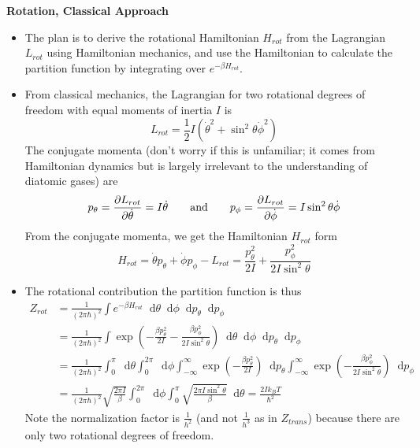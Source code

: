 \documentclass[11pt, a4paper]{article}
\newcommand{\diff}{\mathop{}\!\mathrm{d}} %
\begin{document}
\smallskip
\textbf{Rotation, Classical Approach}
\begin{itemize}
	\item The plan is to derive the rotational Hamiltonian $ H_{rot} $ from the Lagrangian $ L_{rot} $ using Hamiltonian mechanics, and use the Hamiltonian to calculate the partition function by integrating over $ e^{-\beta H_{rot}} $. 
	
	\item From classical mechanics, the Lagrangian for two rotational degrees of freedom with equal moments of inertia $ I $ is
	\begin{equation*}
		L_{rot} = \frac{1}{2} I\left(\dot{\theta}^{2} + \sin^{2}\theta \dot{\phi}^{2}\right)
	\end{equation*}
	The conjugate momenta (don't worry if this is unfamiliar; it comes from Hamiltonian dynamics but is largely irrelevant to the understanding of diatomic gases) are
	\begin{equation*}
		p_{\theta}  = \pdv{L_{rot}}{\dot{\theta}} = I \dot{\theta} \qquad \text{and} \qquad p_{\phi}  = \pdv{L_{rot}}{\dot{\phi}} = I \sin^{2}\theta \dot{\phi}
	\end{equation*}
	From the conjugate momenta, we get the Hamiltonian $ H_{rot} $ form
	\begin{equation*}
		H_{rot} = \dot{\theta}p_{\theta} + \dot{\phi}p_{\phi} - L_{rot} = \frac{p_{\theta}^{2}}{2I} + \frac{p_{\phi}^{2}}{2I\sin^{2}\theta}
	\end{equation*}
	
	\item The rotational contribution the partition function is thus
	\begin{align*}
		Z_{rot} &= \frac{1}{(2\pi \hbar)^{2}} \int e^{-\beta H_{rot}} \diff \theta \diff \phi \diff p_{\theta} \diff p_{\phi}\\
		& = \frac{1}{(2\pi \hbar)^{2}} \int \exp(-  \frac{\beta p_{\theta}^{2}}{2I} -  \frac{\beta p_{\phi}^{2}}{2I\sin^{2}\theta}) \diff \theta \diff \phi \diff p_{\theta} \diff p_{\phi}\\
		&= \frac{1}{(2\pi \hbar)^{2}}  \int_{0}^{\pi} \diff \theta  \int_{0}^{2\pi} \diff \phi \int_{-\infty}^{\infty} \exp(-  \frac{\beta p_{\theta}^{2}}{2I}) \diff p_{\theta} \int_{-\infty}^{\infty} \exp(-  \frac{\beta p_{\phi}^{2}}{2I\sin^{2}\theta}) \diff p_{\phi}\\
		&=\frac{1}{(2\pi \hbar)^{2}} \sqrt{\frac{2\pi I}{\beta}}  \int_{0}^{2\pi} \diff \phi  \int_{0}^{\pi} \sqrt{\frac{2\pi I \sin^{2}\theta}{\beta}} \diff \theta = \frac{2Ik_{B}T}{\hbar^{2}}
	\end{align*}
	Note the normalization factor is $\frac{1}{h^{2}}$ (and not $ \frac{1}{h^{3}} $ as in $ Z_{trans} $) because there are only two rotational degrees of freedom.
	

\end{itemize}
\end{document}
